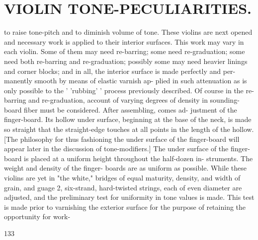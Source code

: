 \documentclass{article}
\begin{document}
\section*{VIOLIN TONE-PECULIARITIES.}
to raise tone-pitch and to diminish volume of tone. These violins are next opened and necessary work is applied to their interior surfaces. This work may vary in each violin. Some of them may need re-barring; some need re-graduation; some need both re-barring and re-graduation; possibly some may need heavier linings and corner blocks; and in all, the interior surface is made perfectly and per- manently smooth by means of elastic varnish ap- plied in such attenuation as is only possible to the ' 'rubbing' ' process previously described. Of course in the re-barring and re-graduation, account of varying degrees of density in sounding-board fiber must be considered. After assembling, comes ad- justment of the finger-board. Its hollow under surface, beginning at the base of the neck, is made so straight that the straight-edge touches at all points in the length of the hollow. [The philosophy for thus fashioning the under surface of the finger-board will appear later in the discussion of tone-modifiers.] The under surface of the finger-board is placed at a uniform height throughout the half-dozen in- struments. The weight and density of the finger- boards are as uniform as possible. While these violins are yet in "the white," bridges of equal maturity, density, and width of grain, and guage 2, six-strand, hard-twisted strings, each of even diameter are adjusted, and the preliminary test for uniformity in tone values is made. This test is made prior to varnishing the exterior surface for the purpose of retaining the opportunity for work-

133
\end{document}
